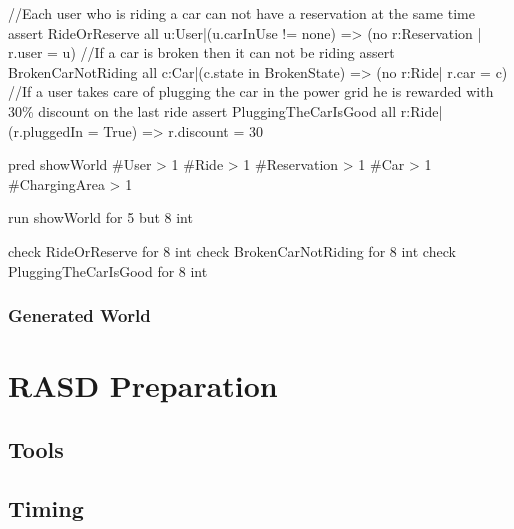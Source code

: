 \documentclass[11pt,a4paper]{report}
\begin{document}
\begin{alloyCode}
//Each user who is riding a car can not have a reservation at the same time
assert RideOrReserve{
	all u:User|(u.carInUse != none) => (no r:Reservation | r.user = u)
}
//If a car is broken then it can not be riding
assert BrokenCarNotRiding{
	all c:Car|(c.state in BrokenState) => (no r:Ride| r.car = c)
}
//If a user takes care of plugging the car in the power grid he is rewarded with 30\% discount on the last ride
assert PluggingTheCarIsGood{
	all r:Ride|(r.pluggedIn = True) => r.discount = 30
}

pred showWorld{
	#User > 1
	#Ride > 1 
	#Reservation > 1
	#Car > 1 
	#ChargingArea > 1
}

run showWorld for 5 but 8 int

check RideOrReserve for 8 int
check BrokenCarNotRiding for 8 int
check PluggingTheCarIsGood for 8 int
\end{alloyCode} 
\subsection{Generated World}

\chapter{RASD Preparation}
\section{Tools}
\section{Timing}
\end{document}
